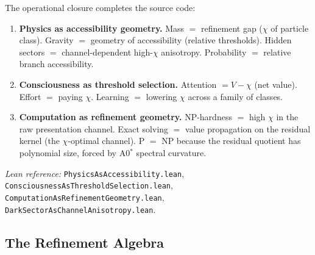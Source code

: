 The operational closure completes the source code:
\begin{enumerate}
\item \textbf{Physics as accessibility geometry.}  Mass $=$ refinement gap ($\chi$ of particle class).  Gravity $=$ geometry of accessibility (relative thresholds).  Hidden sectors $=$ channel-dependent high-$\chi$ anisotropy.  Probability $=$ relative branch accessibility.

\item \textbf{Consciousness as threshold selection.}  Attention $= V - \chi$ (net value).  Effort $=$ paying $\chi$.  Learning $=$ lowering $\chi$ across a family of classes.

\item \textbf{Computation as refinement geometry.}  NP-hardness $=$ high $\chi$ in the raw presentation channel.  Exact solving $=$ value propagation on the residual kernel (the $\chi$-optimal channel).  P $=$ NP because the residual quotient has polynomial size, forced by A0$^*$ spectral curvature.
\end{enumerate}

\emph{Lean reference:} \texttt{PhysicsAsAccessibility.lean}, \texttt{ConsciousnessAsThresholdSelection.lean}, \texttt{ComputationAsRefinementGeometry.lean}, \texttt{DarkSectorAsChannelAnisotropy.lean}.

\subsection{The Refinement Algebra}
\label{sec:manifestability:algebra}


